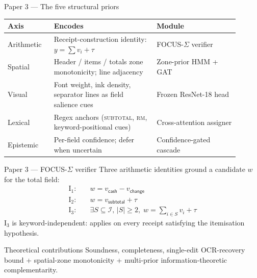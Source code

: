 \documentclass{beamer}
\begin{document}
\begin{frame}{Paper 3 --- The five structural priors}
  \small
  \begin{tabular}{p{0.18\linewidth}p{0.4\linewidth}p{0.32\linewidth}}
    \toprule
    Axis & Encodes & Module \\ \midrule
    Arithmetic & Receipt-construction identity:
                 $y = \sum v_i + \tau$
              & FOCUS-$\Sigma$ verifier \\
    Spatial    & Header / items / totals zone monotonicity;
                 line adjacency
              & Zone-prior HMM + GAT \\
    Visual     & Font weight, ink density, separator lines as
                 field salience cues
              & Frozen ResNet-18 head \\
    Lexical    & Regex anchors (\textsc{subtotal}, \textsc{rm},
                 keyword-positional cues)
              & Cross-attention assigner \\
    Epistemic  & Per-field confidence; defer when uncertain
              & Confidence-gated cascade \\
    \bottomrule
  \end{tabular}
\end{frame}

\begin{frame}{Paper 3 --- FOCUS-$\Sigma$ verifier}
  Three arithmetic identities ground a candidate $w$ for the
  \textsf{total} field:
  \begin{align*}
    \mathrm{I}_1: & \quad w = v_{\textsf{cash}} - v_{\textsf{change}} \\
    \mathrm{I}_2: & \quad w = v_{\textsf{subtotal}} + \tau \\
    \mathrm{I}_3: & \quad \exists S \subseteq \mathcal{I},\, |S|\ge 2,\;
                          w = \sum_{i\in S} v_i + \tau
  \end{align*}
  $\mathrm{I}_3$ is keyword-independent: applies on every receipt
  satisfying the itemisation hypothesis.
  \vspace{0.5em}
  \begin{block}{Theoretical contributions}
    Soundness, completeness, single-edit OCR-recovery
    bound + spatial-zone monotonicity + multi-prior
    information-theoretic complementarity.
  \end{block}
\end{frame}
\end{document}
